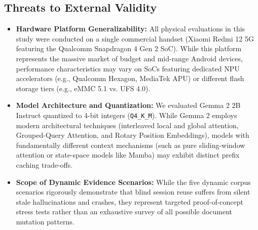 \subsection{Threats to External Validity}
\begin{itemize}
    \item \textbf{Hardware Platform Generalizability:} All physical evaluations in this study were conducted on a single commercial handset (Xiaomi Redmi 12 5G featuring the Qualcomm Snapdragon 4 Gen 2 SoC). While this platform represents the massive market of budget and mid-range Android devices, performance characteristics may vary on SoCs featuring dedicated NPU accelerators (e.g., Qualcomm Hexagon, MediaTek APU) or different flash storage tiers (e.g., eMMC 5.1 vs. UFS 4.0).
    \item \textbf{Model Architecture and Quantization:} We evaluated Gemma 2 2B Instruct quantized to 4-bit integers (\texttt{Q4\_K\_M}). While Gemma 2 employs modern architectural techniques (interleaved local and global attention, Grouped-Query Attention, and Rotary Position Embeddings), models with fundamentally different context mechanisms (such as pure sliding-window attention or state-space models like Mamba) may exhibit distinct prefix caching trade-offs.
    \item \textbf{Scope of Dynamic Evidence Scenarios:} While the five dynamic corpus scenarios rigorously demonstrate that blind session reuse suffers from silent stale hallucinations and crashes, they represent targeted proof-of-concept stress tests rather than an exhaustive survey of all possible document mutation patterns.
\end{itemize}

